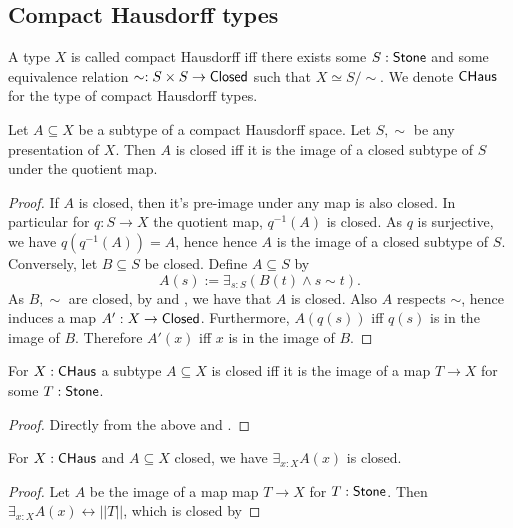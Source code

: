 \subsection{Compact Hausdorff types}
\begin{definition}
  A type $X$ is called compact Hausdorff iff there exists some $S:\mathsf{Stone}$ and some 
  equivalence relation $\sim:S \times S \to \mathsf{Closed}$ such that $X \simeq S / \sim$. 
  We denote $\mathsf{CHaus}$ for the type of compact Hausdorff types. 
\end{definition} 

\begin{lemma}
Let $A\subseteq X$ be a subtype of a compact Hausdorff space. 
Let $S, \sim$ be any presentation of $X$. 
Then $A$ is closed iff it is the image of a closed subtype of $S$ under the quotient map. 
\end{lemma}
\begin{proof}
  If $A$ is closed, then it's pre-image under any map is also closed. 
  In particular for $q:S\to X$ the quotient map, $q^{-1}(A)$ is closed. 
  As $q$ is surjective, we have $q(q^{-1}(A)) = A$, hence 
  hence $A$ is the image of a closed subtype of $S$. 
  Conversely, let $B\subseteq S$ be closed. 
  Define $A\subseteq S$ by 
  $$A(s) := \exists_{s:S} (B(t) \wedge s \sim t).$$
  As $B, \sim$ are closed, by  and , 
  we have that $A$  is closed. 
  Also $A$ respects $\sim$, hence induces a map $A': X\to \mathsf{Closed}$.
  Furthermore, $A(q(s))$ iff $q(s)$ is in the image of $B$. 
  Therefore $A'(x)$ iff $x$ is in the image of $B$. 
%
%
\end{proof}
\begin{corollary}
  For $X:\mathsf{CHaus}$ a subtype $A\subseteq X$ is closed iff it is the image of 
  a map $T\to X$ for some $T:\mathsf{Stone}$. 
\end{corollary}
\begin{proof}
  Directly from the above and .
\end{proof}

\begin{corollary}\label{InhabitedClosedSubSpaceClosed}
  For $X:\mathsf{CHaus}$ and $A\subseteq X$ closed, we have 
  $\exists_{x:X} A(x)$ is closed. 
\end{corollary}
\begin{proof}
  Let $A$ be the image of a map map $T\to X$ for $T:\mathsf{Stone}$. 
  Then $\exists_{x:X} A(x) \leftrightarrow ||T||$, which is closed by 
\end{proof}


